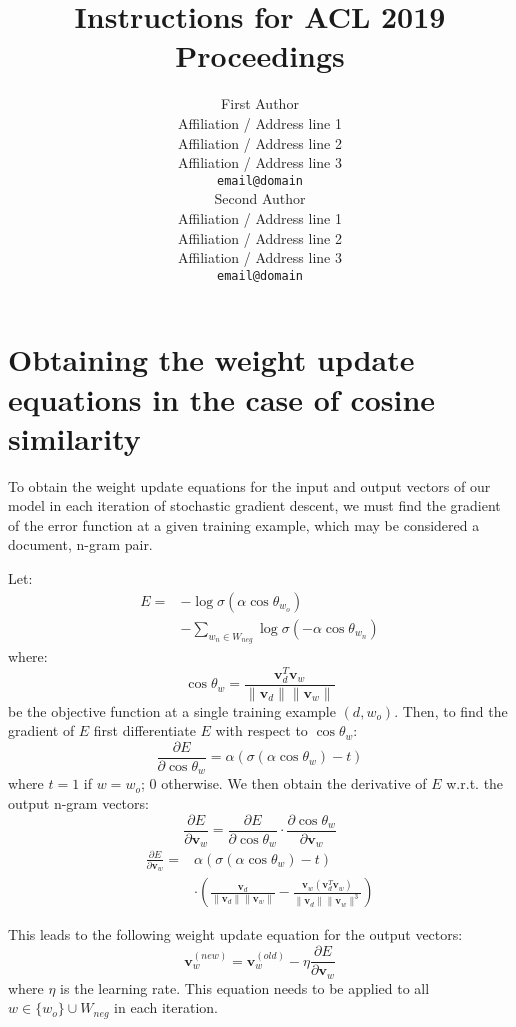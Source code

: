 \documentclass[11pt,a4paper]{article}
\title{Instructions for ACL 2019 Proceedings}
\author{First Author \\
  Affiliation / Address line 1 \\
  Affiliation / Address line 2 \\
  Affiliation / Address line 3 \\
  \texttt{email@domain} \\\And
  Second Author \\
  Affiliation / Address line 1 \\
  Affiliation / Address line 2 \\
  Affiliation / Address line 3 \\
  \texttt{email@domain} \\}
\date{}
\begin{document}
\appendix

\section{Obtaining the weight update equations in the case of cosine similarity}

To obtain the weight update equations for the input and output vectors of our model in each iteration of stochastic gradient descent, we must find the gradient of the error function at a given training example, which may be considered a document, n-gram pair. 

Let: 
\begin{align}
E =  &- \log \sigma \left( \alpha \cos \theta_{w_o} \right) \nonumber \\
&- \sum_{w_n \in W_{neg}} \log \sigma \left( - \alpha \cos \theta_{w_n} \right)  
\end{align}
where:
\begin{equation}
\cos \theta_w = \frac {\mathbold{v}_d^T \mathbold{v}_w} {\lVert \mathbold{v}_d \rVert \lVert \mathbold{v}_w \rVert}
\end{equation}
be the objective function at a single training example $(d,w_o)$. Then, to find the gradient of $E$ first differentiate $E$ with respect to $\cos \theta_w$: 
\begin{equation}
\frac {\partial E} {\partial \cos \theta_w} = \alpha \left( \sigma \left( \alpha \cos \theta_w \right) - t \right)
\end{equation}
where $t = 1$ if $w = w_o$; $0$ otherwise. We then obtain the derivative of $E$ w.r.t. the output n-gram vectors: 
\begin{equation}
\frac {\partial E} {\partial \mathbold{v}_w} = \frac {\partial E} {\partial \cos \theta_w} \cdot \frac {\partial \cos \theta_w} {\partial \mathbold{v}_w} 
\end{equation}
\begin{align}
\frac {\partial E} {\partial \mathbold{v}_w} = {}&\alpha \left( \sigma \left( \alpha \cos \theta_w \right) - t \right) \nonumber \\
&\cdot\left( \frac {\mathbold{v}_d} {\lVert \mathbold{v}_d \rVert \lVert \mathbold{v}_w \rVert} - \frac { \mathbold{v}_w\left(\mathbold{v}_d^T \mathbold{v}_w\right)} {\lVert \mathbold{v}_d \rVert \lVert \mathbold{v}_w \rVert^3} \right)
\end{align}

This leads to the following weight update equation for the output vectors: 
\begin{equation}
\mathbold{v}_w^{(new)} = \mathbold{v}_w^{(old)} - \eta \frac {\partial E} {\partial \mathbold{v}_w}
\end{equation}
where $\eta$ is the learning rate. This equation needs to be applied to all $w \in \{w_o\} \cup W_{neg}$ in each iteration.
\end{document}
